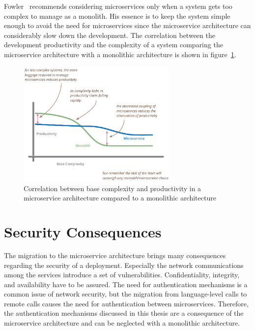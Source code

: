 Fowler~\cite{fowlerpremium} recommends considering microservices only when a system gets too complex to manage as a monolith.
His essence is to keep the system simple enough to avoid the need for microservices since the microservice architecture can considerably slow down the development.
The correlation between the development productivity and the complexity of a system comparing the microservice architecture with a monolithic architecture is shown in figure~\ref{fig:fowler_productivity}.

\begin{figure}[H]
    \centering
    \includegraphics[width=0.7\textwidth]{./images/microservice_architecture/fowler-productivity-complexity.png}
    \caption{Correlation between base complexity and productivity in a microservice architecture compared to a monolithic architecture~\cite{fowlerpremium}}
    \label{fig:fowler_productivity}
\end{figure}

\section{Security Consequences}
The migration to the microservice architecture brings many consequences regarding the security of a deployment.
Especially the network communications among the services introduce a set of vulnerabilities.
Confidentiality, integrity, and availability have to be assured.
The need for authentication mechanisms is a common issue of network security, but the migration from language-level calls to remote calls causes the need for authentication between microservices.
Therefore, the authentication mechanisms discussed in this thesis are a consequence of the microservice architecture and can be neglected with a monolithic architecture.
